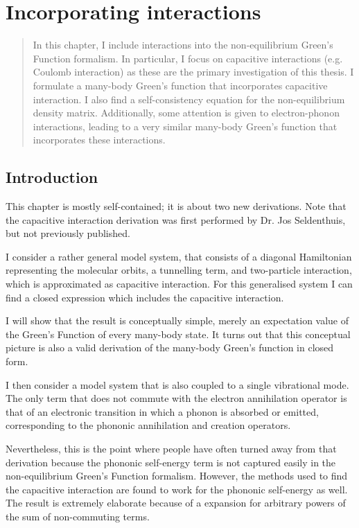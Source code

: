 \chapter{Incorporating interactions}
\label{ch:chapter_3}

\begin{abstract}
In this chapter, I include interactions into the non-equilibrium Green's Function formalism. In particular, I focus on capacitive interactions (e.g. Coulomb interaction) as these are the primary investigation of this thesis. I formulate a many\hyp{}body Green's function that incorporates capacitive interaction. I also find a self-consistency equation for the non-equilibrium density matrix. Additionally, some attention is given to electron-phonon interactions, leading to a very similar many-body Green's function that incorporates these interactions.
\end{abstract}

\newpage
\section{Introduction}
This chapter is mostly self-contained; it is about two new derivations. Note that the capacitive interaction derivation was first performed by Dr. Jos Seldenthuis, but not previously published.

I consider a rather general model system, that consists of a diagonal Hamiltonian representing the molecular orbits, a tunnelling term, and  two-particle interaction, which is approximated as capacitive interaction. For this generalised system I can find a closed expression which includes the capacitive interaction.

I will show that the result is conceptually simple, merely an expectation value of the Green's Function of every many-body state. It turns out that this conceptual picture is also a valid derivation of the many-body Green's function in closed form.

I then consider a model system that is also coupled to a single vibrational mode. The only term that does not commute with the electron annihilation operator is that of an electronic transition in which a phonon is absorbed or emitted, corresponding to the phononic annihilation and creation operators.

Nevertheless, this is the point where people have often turned away from that derivation because the phononic self\hyp{}energy term is not captured easily in the non-equilibrium Green's Function formalism. However, the methods used to find the capacitive interaction are found to work for the phononic self-energy as well. The result is extremely elaborate because of a expansion for arbitrary powers of the sum of non-commuting terms. 

